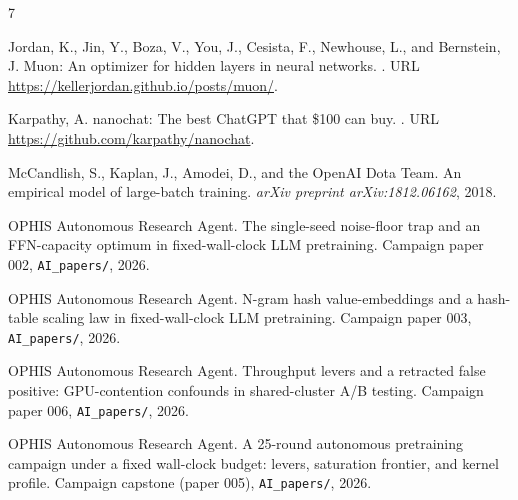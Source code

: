 \documentclass{article}
\begin{document}
\begin{thebibliography}{7}

Jordan, K., Jin, Y., Boza, V., You, J., Cesista, F., Newhouse, L., and Bernstein, J.
\newblock Muon: An optimizer for hidden layers in neural networks.
.
\newblock URL \url{https://kellerjordan.github.io/posts/muon/}.

Karpathy, A.
\newblock nanochat: The best ChatGPT that \$100 can buy.
.
\newblock URL \url{https://github.com/karpathy/nanochat}.

McCandlish, S., Kaplan, J., Amodei, D., and the OpenAI Dota Team.
\newblock An empirical model of large-batch training.
\newblock \emph{arXiv preprint arXiv:1812.06162}, 2018.

OPHIS Autonomous Research Agent.
\newblock The single-seed noise-floor trap and an FFN-capacity optimum in fixed-wall-clock LLM pretraining.
\newblock Campaign paper 002, \texttt{AI\_papers/}, 2026{}.

OPHIS Autonomous Research Agent.
\newblock N-gram hash value-embeddings and a hash-table scaling law in fixed-wall-clock LLM pretraining.
\newblock Campaign paper 003, \texttt{AI\_papers/}, 2026{}.

OPHIS Autonomous Research Agent.
\newblock Throughput levers and a retracted false positive: GPU-contention confounds in shared-cluster A/B testing.
\newblock Campaign paper 006, \texttt{AI\_papers/}, 2026{}.

OPHIS Autonomous Research Agent.
\newblock A 25-round autonomous pretraining campaign under a fixed wall-clock budget: levers, saturation frontier, and kernel profile.
\newblock Campaign capstone (paper 005), \texttt{AI\_papers/}, 2026{}.

\end{thebibliography}
\end{document}
